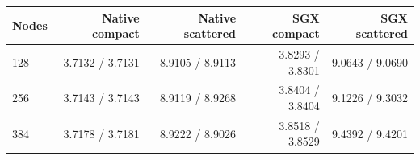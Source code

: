\begin{tabular}{lrrrr}
\toprule
Nodes & Native compact & Native scattered & SGX compact & SGX scattered \\
\midrule
128 & 3.7132 / 3.7131 & 8.9105 / 8.9113 & 3.8293 / 3.8301 & 9.0643 / 9.0690 \\
256 & 3.7143 / 3.7143 & 8.9119 / 8.9268 & 3.8404 / 3.8404 & 9.1226 / 9.3032 \\
384 & 3.7178 / 3.7181 & 8.9222 / 8.9026 & 3.8518 / 3.8529 & 9.4392 / 9.4201 \\
\bottomrule
\end{tabular}
